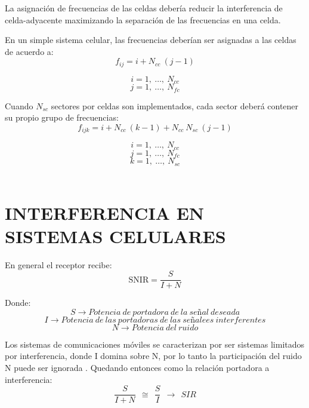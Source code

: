 La asignación de frecuencias de las celdas debería reducir la interferencia de celda-adyacente maximizando la separación de las frecuencias en una celda.\newline

En un simple sistema celular, las frecuencias deberían ser asignadas a las celdas de acuerdo a:\newline
\begin{equation}
    f_{ij}=i+N_{cc}\ (j-1)
    \label{eqn:fij}
\end{equation}

\[i=1,\ \dots ,\ N_{cc}\] 
\[j=1,\ \dots ,\ N_{fc}\] 

Cuando $N_{sc}$ sectores por celdas son implementados, cada sector deberá contener su propio grupo de frecuencias:\newline
\begin{equation}
    f_{ijk}=i+N_{cc}\ \left(k-1\right)+N_{cc}\ N_{sc}\ (j-1)
    \label{eqn:fijk}
\end{equation}

\[i=1,\ \dots ,\ N_{cc}\] 
\[j=1,\ \dots ,\ N_{fc}\] 
\[k=1,\ \dots ,\ N_{sc}\] \\


\section{INTERFERENCIA EN SISTEMAS CELULARES}

En general el receptor recibe:\newline
\begin{equation}
\mathrm{SNIR=}\frac{S}{I+N}
\label{eqn:SNIR}
\end{equation}

Donde:
\[S\to Potencia\ de\ portadora\ de\ la\ se\textrm{\~{n}}al\ deseada\] 
\[I\to Potencia\ de\ las\ portadoras\ de\ las\ se\textrm{\~{n}}alees\ interferentes\] 
\[N\to Potencia\ del\ ruido\] 

Los sistemas de comunicaciones móviles se caracterizan por ser sistemas limitados por interferencia, donde I domina sobre N, por lo tanto la participación del ruido N puede ser ignorada \parencite{Correia2018}.\newline
Quedando entonces como la relación portadora a interferencia:\newline
\begin{equation}
\frac{S}{I+N}\ \ \cong \ \ \frac{S}{I}\ \ \to \ \ SIR
\label{eqn:SIR}
\end{equation}

